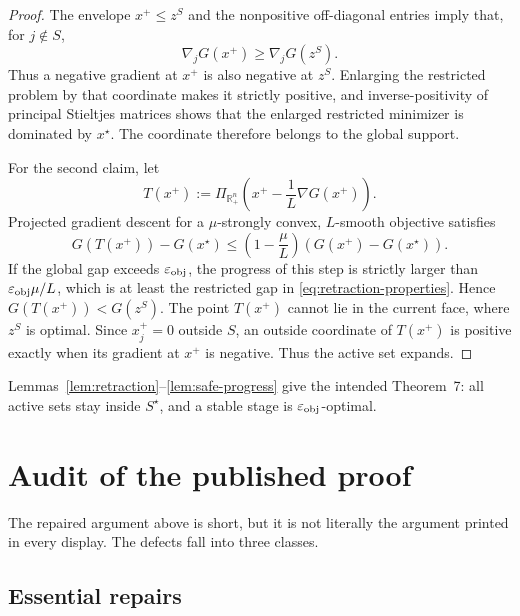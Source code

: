 \documentclass[11pt]{article}
\begin{document}
\begin{proof}
The envelope $x^+\leq z^S$ and the nonpositive off-diagonal entries imply
that, for $j\notin S$,
\[
 \nabla_jG(x^+)\geq\nabla_jG(z^S).
\]
Thus a negative gradient at $x^+$ is also negative at $z^S$.  Enlarging the
restricted problem by that coordinate makes it strictly positive, and
inverse-positivity of principal Stieltjes matrices shows that the enlarged
restricted minimizer is dominated by $x^\star$.  The coordinate therefore
belongs to the global support.

For the second claim, let
\[
 T(x^+):=\Pi_{\mathbb R_+^n}
 \left(x^+-\frac1L\nabla G(x^+)\right).
\]
Projected gradient descent for a $\mu$-strongly convex, $L$-smooth objective
satisfies
\[
 G(T(x^+))-G(x^\star)
 \leq\left(1-\frac\mu L\right)
       (G(x^+)-G(x^\star)).
\]
If the global gap exceeds $\varepsilon_{\rm obj}$, the progress of this step
is strictly larger than $\varepsilon_{\rm obj}\mu/L$, which is at least the
restricted gap in \cref{eq:retraction-properties}.  Hence
$G(T(x^+))<G(z^S)$.  The point $T(x^+)$ cannot lie in the current face, where
$z^S$ is optimal.  Since $x_j^+=0$ outside $S$, an outside coordinate of
$T(x^+)$ is positive exactly when its gradient at $x^+$ is negative.  Thus
the active set expands.
\end{proof}

Lemmas~\ref{lem:retraction}--\ref{lem:safe-progress} give the intended
Theorem~7: all active sets stay inside $S^\star$, and a stable stage is
$\varepsilon_{\rm obj}$-optimal.

\section{Audit of the published proof}
\label{sec:audit}

The repaired argument above is short, but it is not literally the argument
printed in every display.  The defects fall into three classes.

\subsection{Essential repairs}
\end{document}
